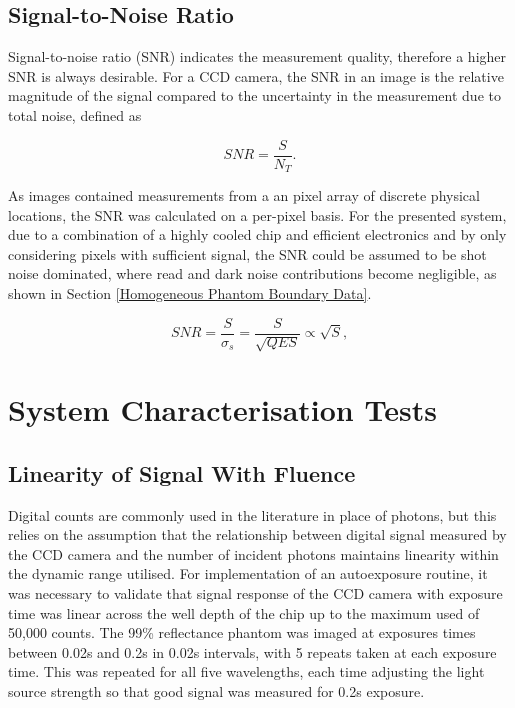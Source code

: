 \documentclass[twoside]{bhamthesis}
\theoremstyle{definition}
\begin{document}
\subsection{Signal-to-Noise Ratio} 
\label{SNR}
Signal-to-noise ratio (SNR) indicates the measurement quality, therefore a higher SNR is always desirable. For a CCD camera, the SNR in an image is the relative magnitude of the signal compared to the uncertainty in the measurement due to total noise, defined as 

\begin{equation}
{ SNR= \frac{S}{N_T}}.
  \label{eqn:SNR}
\end{equation}

As images contained measurements from a an pixel array of discrete physical locations, the SNR was calculated on a per-pixel basis. For the presented system, due to a combination of a highly cooled chip and efficient electronics and by only considering pixels with sufficient signal, the SNR could be assumed to be shot noise dominated, where read and dark noise contributions become negligible, as shown in Section \ref{Homogeneous Phantom Boundary Data}.

\begin{equation}
{ SNR= \frac{S}{\sigma_s}= \frac{S}{\sqrt{QES}}} \propto \sqrt{S},
  \label{eqn:SNR}
\end{equation}

\section{System Characterisation Tests}

\subsection{Linearity of Signal With Fluence}
\label{Linearity of Signal with Exposure Time}

Digital counts are commonly used in the literature in place of photons, but this relies on the assumption that the relationship between digital signal measured by the CCD camera and the number of incident photons maintains linearity within the dynamic range utilised. For implementation of an autoexposure routine, it was necessary to validate that signal response of the CCD camera with exposure time was linear across the well depth of the chip up to the maximum used of 50,000 counts. The 99\% reflectance phantom was imaged at exposures times between 0.02s and 0.2s in 0.02s intervals, with 5 repeats taken at each exposure time. This was repeated for all five wavelengths, each time adjusting the light source strength so that good signal was measured for 0.2s exposure.
\end{document}
